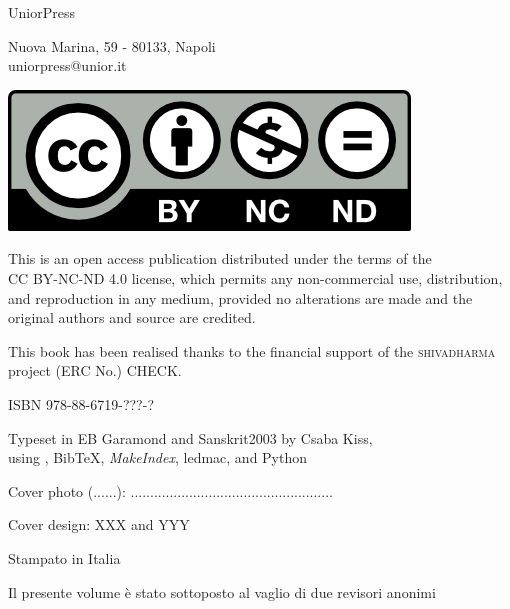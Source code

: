 \begin{center}
UniorPress

{\footnotesize Nuova Marina, 59 - 80133, Napoli\\
uniorpress@unior.it}
\bigskip
\bigskip

\includegraphics[scale=1]{by-nc-nd.png}
\smallskip


This is an open access publication distributed under the terms of the\\
CC BY-NC-ND 4.0 license, which
permits any non-commercial use, distribution, and reproduction in any medium, provided no
alterations are made and the original authors and source are credited.
\bigskip

This book has been realised thanks to the financial support of the \textsc{shivadharma} project
(ERC No.) CHECK.

\bigskip
ISBN 978-88-6719-???-?
\medskip

Typeset in EB Garamond and Sanskrit2003 by Csaba Kiss,\\
using \XeLaTeX, Bib\TeX, \textit{MakeIndex}, ledmac, and Python

\bigskip
Cover photo (......): ....................................................
\medskip

Cover design: XXX and YYY 
\medskip

Stampato in Italia

Il presente volume è stato sottoposto al vaglio di due revisori anonimi


\end{center}


\pagebreak



